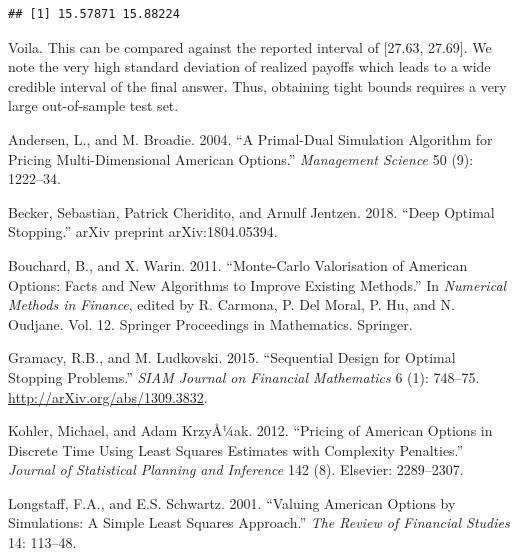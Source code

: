 \documentclass[]{article}
\begin{document}
\begin{verbatim}
## [1] 15.57871 15.88224
\end{verbatim}

Voila. This can be compared against the reported interval of {[}27.63,
27.69{]}. We note the very high standard deviation of realized payoffs
which leads to a wide credible interval of the final answer. Thus,
obtaining tight bounds requires a very large out-of-sample test set.

\hypertarget{refs}{}
\hypertarget{ref-Broadie}{}
Andersen, L., and M. Broadie. 2004. ``A Primal-Dual Simulation Algorithm
for Pricing Multi-Dimensional American Options.'' \emph{Management
Science} 50 (9): 1222--34.

\hypertarget{ref-CheriditoJentzen18}{}
Becker, Sebastian, Patrick Cheridito, and Arnulf Jentzen. 2018. ``Deep
Optimal Stopping.'' arXiv preprint arXiv:1804.05394.

\hypertarget{ref-BouchardWarin10}{}
Bouchard, B., and X. Warin. 2011. ``Monte-Carlo Valorisation of American
Options: Facts and New Algorithms to Improve Existing Methods.'' In
\emph{Numerical Methods in Finance}, edited by R. Carmona, P. Del Moral,
P. Hu, and N. Oudjane. Vol. 12. Springer Proceedings in Mathematics.
Springer.

\hypertarget{ref-GL13}{}
Gramacy, R.B., and M. Ludkovski. 2015. ``Sequential Design for Optimal
Stopping Problems.'' \emph{SIAM Journal on Financial Mathematics} 6 (1):
748--75. \url{http://arXiv.org/abs/1309.3832}.

\hypertarget{ref-Kohler12lasso}{}
Kohler, Michael, and Adam KrzyÅ¼ak. 2012. ``Pricing of American Options
in Discrete Time Using Least Squares Estimates with Complexity
Penalties.'' \emph{Journal of Statistical Planning and Inference} 142
(8). Elsevier: 2289--2307.

\hypertarget{ref-LS}{}
Longstaff, F.A., and E.S. Schwartz. 2001. ``Valuing American Options by
Simulations: A Simple Least Squares Approach.'' \emph{The Review of
Financial Studies} 14: 113--48.
\end{document}
